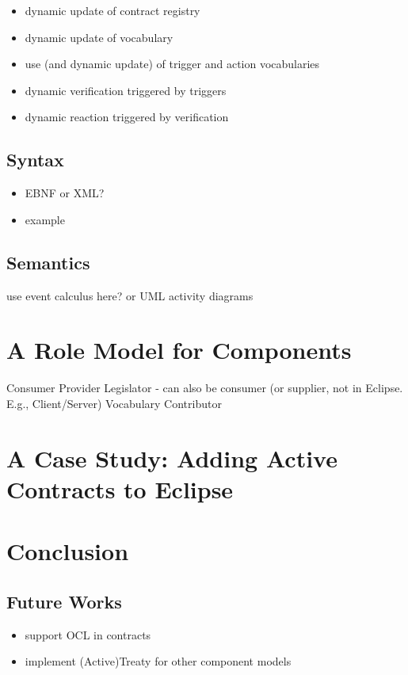 \documentclass{llncs}
\begin{document}
\begin{itemize}
  \item dynamic update of contract registry
  \item dynamic update of vocabulary
  \item use (and dynamic update) of trigger and action vocabularies
  \item dynamic verification triggered by triggers
  \item dynamic reaction triggered by verification
\end{itemize}


\subsection{Syntax}

\begin{itemize}
\item EBNF or XML?
\item example
\end{itemize}


\subsection{Semantics}

use event calculus here? or UML activity diagrams



\section{A Role Model for Components}

Consumer
Provider
Legislator - can also be consumer (or supplier, not in Eclipse. E.g., Client/Server)
Vocabulary Contributor



\section{A Case Study: Adding Active Contracts to Eclipse}



\section{Conclusion}


\subsection{Future Works}

\begin{itemize}
	\item support OCL in contracts
	\item implement (Active)Treaty for other component models
\end{itemize}



  
    
\end{document}
